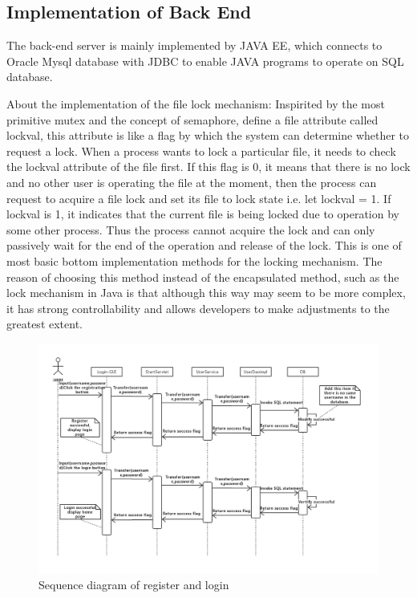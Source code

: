 \documentclass[a4paper,11pt]{article}
\begin{document}
\subsection{Implementation of Back End}

\par The back-end server is mainly implemented by JAVA EE, which connects to Oracle Mysql database with JDBC to enable JAVA programs to operate on SQL database.

\par About the implementation of the file lock mechanism: Inspirited by the most primitive mutex and the concept of semaphore, define a file attribute called lockval, this attribute is like a flag by which the system can determine whether to request a lock. When a process wants to lock a particular file, it needs to check the lockval attribute of the file first. If this flag is 0, it means that there is no lock and no other user is operating the file at the moment, then the process can request to acquire a file lock and set its file to lock state i.e. let lockval = 1. If lockval is 1, it indicates that the current file is being locked due to operation by some other process. Thus the process cannot acquire the lock and can only passively wait for the end of the operation and release of the lock. This is one of most basic bottom implementation methods for the locking mechanism. The reason of choosing this method instead of the encapsulated method, such as the lock mechanism in Java is that although this way may seem to be more complex, it has strong controllability and allows developers to make adjustments to the greatest extent.

\begin{figure}[ht]

\centering
\includegraphics[scale=0.39]{Sequence_diagram_register_and_login.png}
\caption{Sequence diagram of register and login}
\label{fig:Sequence diagram of registration and login}
\end{figure}
\end{document}
